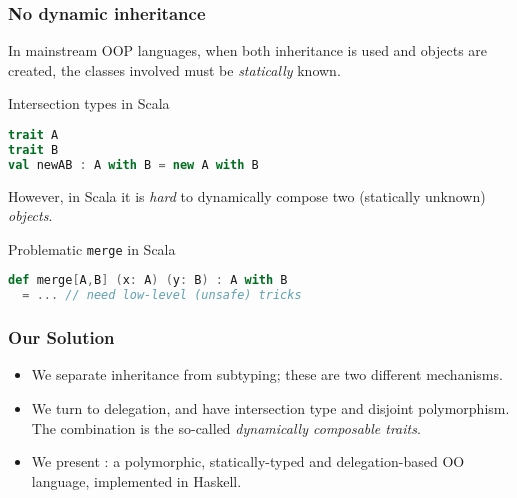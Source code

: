 \documentclass{beamer}
\begin{document}
\begin{frame}[fragile]
  \frametitle{No dynamic inheritance}

  In mainstream OOP languages, when both inheritance is used and objects are
  created, the classes involved must be \textit{statically} known.

  \begin{exampleblock}{Intersection types in Scala}
\begin{lstlisting}[language=scala]
trait A
trait B
val newAB : A with B = new A with B
\end{lstlisting}
  \end{exampleblock}


  \pause

  However, in Scala it is \textit{hard} to dynamically compose two (statically
  unknown) \emph{objects}.

  \begin{exampleblock}{Problematic \lstinline{merge} in Scala}

\begin{lstlisting}[language=scala]
def merge[A,B] (x: A) (y: B) : A with B
  = ... // need low-level (unsafe) tricks
\end{lstlisting}

  \end{exampleblock}




\end{frame}


\begin{frame}
  \frametitle{Our Solution}

  \begin{itemize}
  \item We separate inheritance from subtyping; these are two different
    mechanisms.
  \item We turn to delegation, and have intersection type and disjoint
    polymorphism. The combination is the so-called \textit{dynamically
      composable traits}.
  \item We present \name: a polymorphic, statically-typed and delegation-based
    OO language, implemented in Haskell.
  \end{itemize}



\end{frame}



\end{document}
